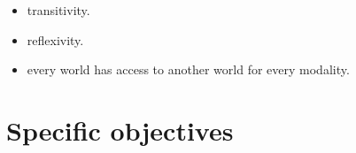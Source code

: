 \documentclass{tufte-book} %
\begin{document}

\begin{itemize}[topsep=0pt,itemsep=-1ex,partopsep=1ex,parsep=1ex]
\item transitivity.
\item reflexivity.
\item every world has access to another world for every modality.
\end{itemize}



\section{Specific objectives}


\backmatter




\end{document}
